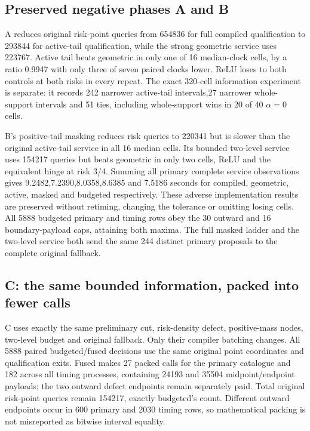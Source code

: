 \hypertarget{preserved-negative-phases-a-and-b}{%
\subsection{Preserved negative phases A and B}\label{preserved-negative-phases-a-and-b}}

A reduces original risk-point queries from 654836 for full compiled qualification to 293844 for active-tail qualification, while the strong geometric service uses 223767. Active tail beats geometric in only one of 16 median-clock cells, by a ratio 0.9947 with only three of seven paired clocks lower. ReLU loses to both controls at both risks in every repeat. The exact 320-cell information experiment is separate: it records 242 narrower active-tail intervals,27 narrower whole-support intervals and 51 ties, including whole-support wins in 20 of 40 \(\alpha=0\) cells.

B's positive-tail masking reduces risk queries to 220341 but is slower than the original active-tail service in all 16 median cells. Its bounded two-level service uses 154217 queries but beats geometric in only two cells, ReLU and the equivalent hinge at risk 3/4. Summing all primary complete service observations gives 9.2482,7.2390,8.0358,8.6385 and 7.5186 seconds for compiled, geometric, active, masked and budgeted respectively. These adverse implementation results are preserved without retiming, changing the tolerance or omitting losing cells. All 5888 budgeted primary and timing rows obey the 30 outward and 16 boundary-payload caps, attaining both maxima. The full masked ladder and the two-level service both send the same 244 distinct primary proposals to the complete original fallback.

\hypertarget{c-the-same-bounded-information-packed-into-fewer-calls}{%
\subsection{C: the same bounded information, packed into fewer calls}\label{c-the-same-bounded-information-packed-into-fewer-calls}}

C uses exactly the same preliminary cut, risk-density defect, positive-mass nodes, two-level budget and original fallback. Only their compiler batching changes. All 5888 paired budgeted/fused decisions use the same original point coordinates and qualification exits. Fused makes 27 packed calls for the primary catalogue and 182 across all timing processes, containing 24193 and 35504 midpoint/endpoint payloads; the two outward defect endpoints remain separately paid. Total original risk-point queries remain 154217, exactly budgeted's count. Different outward endpoints occur in 600 primary and 2030 timing rows, so mathematical packing is not misreported as bitwise interval equality.

